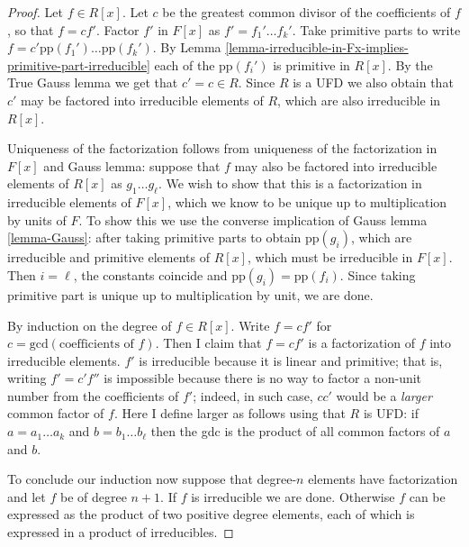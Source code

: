 \begin{proof}
Let $f\in R[x]$. Let $c$ be the greatest common divisor of the coefficients of
$f$, so that $f=cf'$. Factor $f'$ in $F[x]$ as $f'=f_1'\ldots f_k'$. Take
primitive parts to write $f=c'\text{pp}(f_1')\ldots \text{pp}(f_k')$. By Lemma
\ref{lemma-irreducible-in-Fx-implies-primitive-part-irreducible} each of the
$\text{pp}(f_i')$ is primitive in $R[x]$. By the True Gauss lemma we get that
$c'=c\in R$. Since $R$ is a UFD we also obtain that
$c'$ may be factored into irreducible elements of $R$, which are also
irreducible in $R[x]$.

Uniqueness of the factorization follows from uniqueness of the factorization in
$F[x]$ and Gauss lemma: suppose that $f$ may also be factored into irreducible
elements of $R[x]$ as $g_1\ldots g_\ell$. We wish to show that this is a
factorization in irreducible elements of $F[x]$, which we know to be unique up
to multiplication by units of $F$. To show this we use the converse implication
of Gauss lemma \ref{lemma-Gauss}: after taking primitive parts to obtain
$\text{pp}(g_i)$, which are irreducible and primitive elements of $R[x]$, which
must be irreducible in $F[x]$. Then $i=\ell$, the constants coincide and
$\text{pp}(g_i)=\text{pp}(f_i)$. Since taking primitive part is unique up to
multiplication by unit, we are done.

By induction on the degree of $f \in R[x]$. Write $f=cf'$ for
$c=\text{gcd}(\text{coefficients of $f$})$. Then I claim that $f=cf'$ is a
factorization of $f$ into irreducible elements. $f'$ is irreducible because it
is linear and primitive; that is, writing $f'=c'f''$ is impossible because
there is no way to factor a non-unit number from the coefficients of $f'$;
indeed, in such case, $cc'$ would be a {\it larger} common factor of $f$. Here I
define larger as follows using that $R$ is UFD: if $a=a_1\ldots a_k$ and
$b=b_1\ldots b_\ell$ then the gdc is the product of all common factors of $a$
and $b$.

To conclude our induction now suppose that degree-$n$ elements have
factorization and let $f$ be of degree $n+1$. If $f$ is irreducible we are done.
Otherwise $f$ can be expressed as the product of two positive degree elements,
each of which is expressed in a product of irreducibles.
\end{proof}



